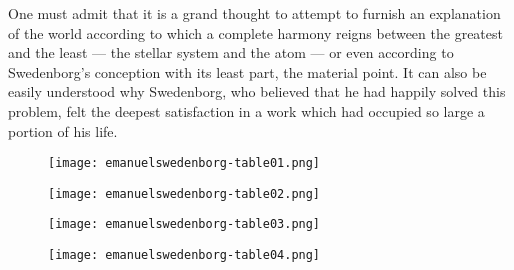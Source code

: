 \documentclass[a4paper, 11pt, oneside, polutonikogreek, english]{article}
\begin{document}
One must admit that it is a grand thought to attempt to furnish an explanation of the world according to which a complete harmony reigns between the greatest and the least --- the stellar system and the atom --- or even according to Swedenborg's conception with its least part, the material point. It can also be easily understood why Swedenborg, who believed that he had happily solved this problem, felt the deepest satisfaction in a work which had occupied so large a portion of his life.
\clearpage
\vspace*{\fill}
\begin{figure}[H]
\centering
\texttt{[image: emanuelswedenborg-table01.png]}
\end{figure}
\vspace*{\fill}
\clearpage
\vspace*{\fill}
\begin{figure}[H]
\centering
\texttt{[image: emanuelswedenborg-table02.png]}
\end{figure}
\vspace*{\fill}
\clearpage
\vspace*{\fill}
\begin{figure}[H]
\centering
\texttt{[image: emanuelswedenborg-table03.png]}
\end{figure}
\vspace*{\fill}
\clearpage
\vspace*{\fill}
\begin{figure}[H]
\centering
\texttt{[image: emanuelswedenborg-table04.png]}
\end{figure}
\vspace*{\fill}
\clearpage
\end{document}
